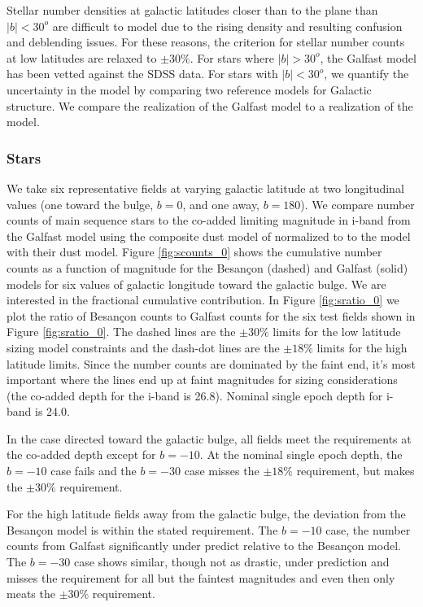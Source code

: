 \documentclass[]{article}
\begin{document}
{Stellar number densities at galactic latitudes closer than to the plane than $|b| < 30^o$ are difficult to model due to the rising density and resulting confusion and deblending issues.
For these reasons, the criterion for stellar number counts at low latitudes are relaxed to $\pm 30\%$. 
For stars where $|b| > 30^o$, the Galfast model has been vetted against the SDSS data.  For stars with $|b| < 30^o$, we quantify the uncertainty in the model by comparing two reference models for Galactic structure.
We compare the realization of the Galfast model to a realization of the \citet{besancon} model.

\subsubsection{Stars}
We take six representative fields at varying galactic latitude at two longitudinal values (one toward the bulge, $b=0$, and one away, $b=180$).  
We compare number 
counts of main sequence stars to the co-added limiting magnitude in i-band 
 from the Galfast model using the composite dust model
of \citet{amores05} normalized to \citet{schlegel98} to the \citet{besancon} model with their dust model.  Figure \ref{fig:scounts_0} shows 
the cumulative number counts as a function of magnitude for the Besan\c{c}on (dashed) and Galfast (solid) models 
for six values of galactic longitude toward the galactic bulge.  We are interested in the
fractional cumulative contribution.  In Figure \ref{fig:sratio_0} we plot the ratio of Besan\c{c}on counts to Galfast counts for the six test fields shown in Figure \ref{fig:sratio_0}.
The dashed lines are the $\pm30\%$ limits for the low latitude sizing model constraints and the dash-dot lines are the $\pm18\%$ limits for the high latitude limits.
Since the number counts are dominated by the faint end, it's most important where the lines end up at faint magnitudes for sizing considerations 
(the co-added depth for the i-band is 26.8).  
Nominal single epoch depth for i-band is 24.0.  

In the case directed toward the galactic bulge, all fields meet the requirements at the co-added depth except
for $b=-10$.  At the nominal single epoch depth, the $b=-10$ case fails and the $b=-30$ case misses the $\pm18\%$
requirement, but makes the $\pm30\%$ requirement.

For the high latitude fields away from the galactic bulge, the deviation from the Besan\c{c}on model is within 
the stated requirement.  The $b=-10$ case, the number counts from Galfast significantly under predict relative to 
the Besan\c{c}on model.  The $b=-30$ case shows similar, though not as drastic, under prediction and misses the 
requirement for all but the faintest magnitudes and even then only meats the $\pm30\%$ requirement.

}
\end{document}
